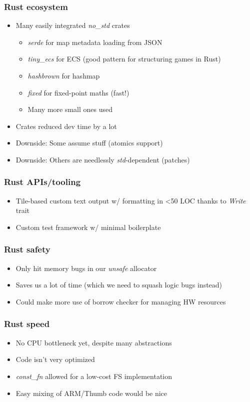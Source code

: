 \documentclass{beamer}
\begin{document}
\begin{frame}
\frametitle{Rust ecosystem}
\begin{itemize}
	\item Many easily integrated \emph{no\_std} crates
    \begin{itemize}
    	\item \emph{serde} for map metadata loading from JSON
    	\item \emph{tiny\_ecs} for ECS (good pattern for structuring games in Rust)
    	\item \emph{hashbrown} for hashmap
    	\item \emph{fixed} for fixed-point maths (fast!)
    	\item Many more small ones used
    \end{itemize}
	\item Crates reduced dev time by a lot
	\item Downside: Some assume stuff (atomics support)
	\item Downside: Others are needlessly \emph{std}-dependent (patches)
\end{itemize}
\end{frame}

\begin{frame}
\frametitle{Rust APIs/tooling}
\begin{itemize}
	\item Tile-based custom text output w/ formatting in <50 LOC thanks to \emph{Write} trait
	\item Custom test framework w/ minimal boilerplate
\end{itemize}
\end{frame}

\begin{frame}
\frametitle{Rust safety}
\begin{itemize}
	\item Only hit memory bugs in our \emph{unsafe} allocator
	\item Saves us a lot of time (which we need to squash logic bugs instead)
	\item Could make more use of borrow checker for managing HW resources
\end{itemize}
\end{frame}

\begin{frame}
\frametitle{Rust speed}
\begin{itemize}
	\item No CPU bottleneck yet, despite many abstractions
	\item Code isn't very optimized
    \item \emph{const\_fn} allowed for a low-cost FS implementation
    \item Easy mixing of ARM/Thumb code would be nice
\end{itemize}
\end{frame}
\end{document}
